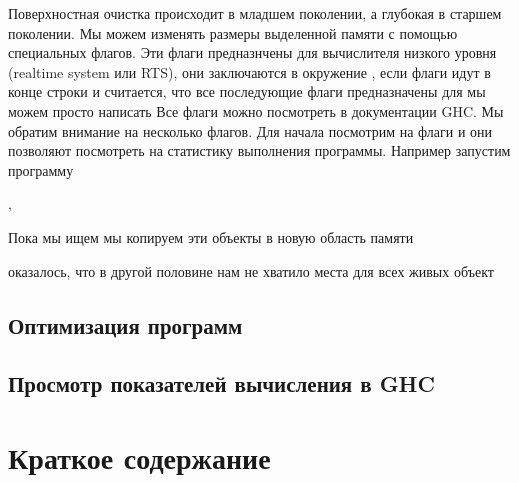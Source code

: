 Поверхностная очистка происходит в младшем поколении, а
глубокая в старшем поколении. Мы можем изменять размеры
выделенной памяти с помощью специальных флагов. 
Эти флаги предназнчены для вычислителя низкого уровня
(realtime system или RTS), они заключаются в окружение 
, если флаги идут в конце строки и считается,
что все последующие флаги предназначены для 
мы можем просто написать 
Все флаги можно посмотреть в документации GHC. Мы обратим
внимание на несколько флагов. Для начала посмотрим на
флаги  и  они позволяют посмотреть
на статистику выполнения программы. Например запустим программу
    
\begin{code}

\end{code}



,



Пока мы ищем мы копируем эти объекты в новую область памяти

оказалось, что 
в другой половине нам не хватило места для всех живых объект


\begin{code}
\end{code}

\begin{code}
\end{code}

\begin{code}
\end{code}

\begin{code}
\end{code}


\subsection{Оптимизация программ}

\subsection{Просмотр показателей вычисления в GHC}
\begin{code}
\end{code}

\begin{code}
\end{code}


\section{Краткое содержание}

